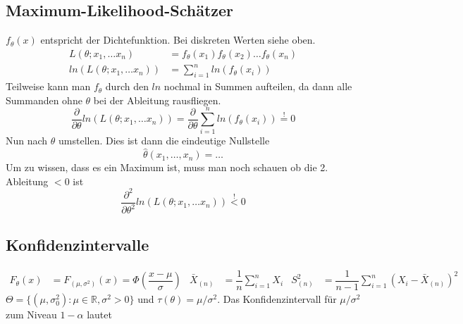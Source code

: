 \documentclass[
ngerman,
accentcolor=9c,%
type=intern,
marginpar=false
]{tudapub}
\begin{document}
        \subsection{Maximum-Likelihood-Schätzer}
            $f_\theta(x)$ entspricht der Dichtefunktion. Bei diskreten Werten siehe oben.
            \begin{align*}
                L(\theta; x_1, \dots x_n) &= f_\theta(x_1)f_\theta(x_2)\dots f_\theta(x_n)\\
                ln\left( L(\theta; x_1, \dots x_n) \right) &= \sum_{i=1}^{n}ln\left( f_\theta(x_i) \right)
            \end{align*}
            Teilweise kann man $f_\theta$ durch den $ln$ nochmal in Summen aufteilen, da dann alle Summanden ohne $\theta$ bei der Ableitung rausfliegen.
            \begin{equation*}
                \frac{\partial}{\partial \theta} ln\left( L(\theta; x_1, \dots x_n) \right) =
                \frac{\partial}{\partial \theta} \sum_{i=1}^{n}ln\left( f_\theta(x_i) \right) \overset{!}{=} 0
            \end{equation*}
            Nun nach $\theta$ umstellen. Dies ist dann die eindeutige Nullstelle
            \begin{equation*}
                \hat{\theta}(x_1, \dots, x_n) = \dots
            \end{equation*}
            Um zu wissen, dass es ein Maximum ist, muss man noch schauen ob die 2. Ableitung $<0$ ist
            \begin{equation*}
                \frac{\partial^2}{\partial \theta^2} ln\left( L(\theta; x_1, \dots x_n) \right) \overset{!}{<} 0
            \end{equation*}
        \subsection{Konfidenzintervalle}
            \begin{align*}
                F_\theta(x) &= F_{(\mu, \sigma^2)}(x)= \Phi(\dfrac{x-\mu}{\sigma}) &
                \bar{X}_{(n)}&=\dfrac{1}{n}\sum_{i=1}^n X_i &
                S^2_{(n)} &= \dfrac{1}{n-1}\sum_{i=1}^n (X_i - \bar{X}_{(n)})^2
            \end{align*}
            $\Theta = \{(\mu, \sigma^2_0):\mu \in \mathbb{R},\sigma^2 > 0\}$ und $\tau(\theta) = \mu/\sigma^2$.
            Das Konfidenzintervall für $\mu/\sigma^2$ zum Niveau $1-\alpha$ lautet
\end{document}
